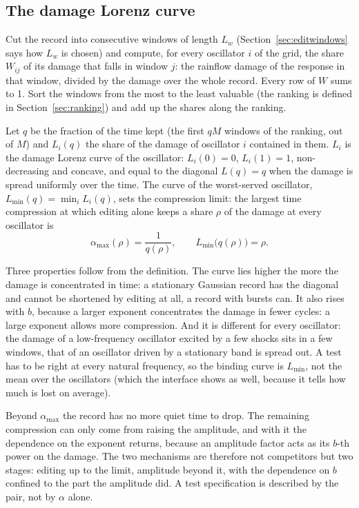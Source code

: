 \subsection{The damage Lorenz curve}\label{sec:lorenz}

Cut the record into consecutive windows of length $L_w$ (Section~\ref{sec:editwindows} says how $L_w$
is chosen) and compute, for every oscillator $i$ of the grid, the share $W_{ij}$ of its damage that
falls in window $j$: the rainflow damage of the response in that window, divided by the damage over
the whole record. Every row of $W$ sums to 1. Sort the windows from the most to the least valuable (the
ranking is defined in Section~\ref{sec:ranking}) and add up the shares along the ranking.

\begin{result}
Let $q$ be the fraction of the time kept (the first $qM$ windows of the ranking, out of $M$) and
$L_i(q)$ the share of the damage of oscillator $i$ contained in them. $L_i$ is the damage Lorenz curve
of the oscillator: $L_i(0) = 0$, $L_i(1) = 1$, non-decreasing and concave, and equal to the diagonal
$L(q) = q$ when the damage is spread uniformly over the time. The curve of the worst-served
oscillator, $L_{\min}(q) = \min_i L_i(q)$, sets the compression limit: the largest time compression
at which editing alone keeps a share $\rho$ of the damage at every oscillator is
\begin{equation}\label{eq:alphamax}
  \alpha_{\max}(\rho) = \frac{1}{q(\rho)},\qquad L_{\min}\bigl(q(\rho)\bigr) = \rho .
\end{equation}
\end{result}

Three properties follow from the definition. The curve lies higher the more the damage is concentrated
in time: a stationary Gaussian record has the diagonal and cannot be shortened by editing at all, a
record with bursts can. It also rises with $b$, because a larger exponent concentrates the damage in
fewer cycles: a large exponent allows more compression. And it is different for every oscillator: the
damage of a low-frequency oscillator excited by a few shocks sits in a few windows, that of an
oscillator driven by a stationary band is spread out. A test has to be right at every natural frequency,
so the binding curve is $L_{\min}$, not the mean over the oscillators (which the interface shows as
well, because it tells how much is lost on average).

Beyond $\alpha_{\max}$ the record has no more quiet time to drop. The remaining compression can only come
from raising the amplitude, and with it the dependence on the exponent returns, because an amplitude
factor acts as its $b$-th power on the damage. The two mechanisms are therefore not competitors but
two stages: editing up to the limit, amplitude beyond it, with the dependence on $b$ confined to the
part the amplitude did. A test specification is described by the pair, not by $\alpha$ alone.

